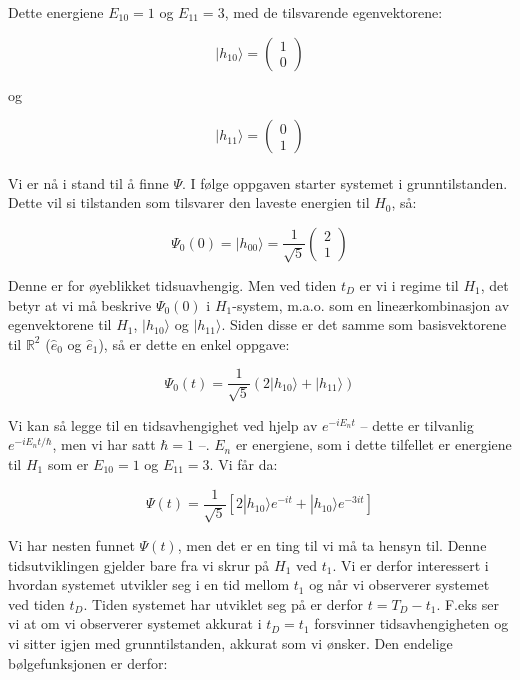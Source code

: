 \documentclass[a4paper,norsk, 10pt]{article}
\numberwithin{equation}{section}
\begin{document}
Dette energiene $E_{10} = 1$ og $E_{11} = 3$, med de tilsvarende egenvektorene:

\begin{equation}
|h_{10}\rangle = 
\begin{pmatrix}
1\\0
\end{pmatrix}
\label{eq:h10}
\end{equation}

og 

\begin{equation}
|h_{11}\rangle = 
\begin{pmatrix}
0\\1
\end{pmatrix}
\label{eq:h11}
\end{equation}\\

Vi er nå i stand til å finne $\Psi$. I følge oppgaven starter systemet i grunntilstanden. Dette vil si tilstanden som tilsvarer den laveste energien til $H_0$, så:

$$
\Psi_0(0) = |h_{00}\rangle = \frac{1}{\sqrt{5}}
\begin{pmatrix}
2\\1
\end{pmatrix}
$$

Denne er for øyeblikket tidsuavhengig. Men ved tiden $t_D$ er vi i regime til $H_1$, det betyr at vi må beskrive $\Psi_0(0)$ i $H_1$-system, m.a.o. som en lineærkombinasjon av egenvektorene til $H_1$, $|h_{10}\rangle$ og $|h_{11}\rangle$. Siden disse er det samme som basisvektorene til $\mathbb{R}^2$ ($\hat{e}_0$ og $\hat{e}_1$), så er dette en enkel oppgave:

$$
\Psi_0(t) = \frac{1}{\sqrt{5}}(2|h_{10}\rangle + |h_{11}\rangle)
$$

Vi kan så legge til en tidsavhengighet ved hjelp av $e^{-iE_nt}$ -- dette er tilvanlig $e^{-iE_nt/\hbar}$, men vi har satt $\hbar = 1$ --. $E_n$ er energiene, som i dette tilfellet er energiene til $H_1$ som er $E_{10} = 1$ og $E_{11} = 3$. Vi får da:

$$
\Psi(t) = \frac{1}{\sqrt{5}}\left[2|h_{10}\rangle e^{-it} + |h_{10}\rangle e^{-3it}\right]
$$

Vi har nesten funnet $\Psi(t)$, men det er en ting til vi må ta hensyn til. Denne tidsutviklingen gjelder bare fra vi skrur på $H_1$ ved $t_1$. Vi er derfor interessert i hvordan systemet utvikler seg i en tid mellom $t_1$ og når vi observerer systemet ved tiden $t_D$. Tiden systemet har utviklet seg på er derfor $t = T_D - t_1$. F.eks ser vi at om vi observerer systemet akkurat i $t_D = t_1$ forsvinner tidsavhengigheten og vi sitter igjen med grunntilstanden, akkurat som vi ønsker. Den endelige bølgefunksjonen er derfor:
\end{document}
